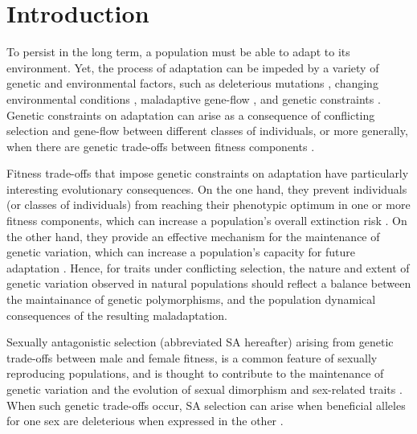 \documentclass[11pt]{article}
\begin{document}
\newpage{}

\section*{Introduction}


To persist in the long term, a population must be able to adapt to its environment. Yet, the process of adaptation can be impeded by a variety of genetic and environmental factors, such as deleterious mutations \citep{Haldane1937}, changing environmental conditions \citep{Maynard-Smith1976, LandeShannon1996,OrrUnckless2008}, maladaptive gene-flow \citep{KirkpatrickBarton1997, BolnickNosil2007}, and genetic constraints \citep{ConnallonHall2018, MatthewsConnallon2019}. Genetic constraints on adaptation can arise as a consequence of conflicting selection and gene-flow between different classes of individuals, or more generally, when there are genetic trade-offs between fitness components \citep{CharlesworthHughes2000, ConnallonHall2018}. 

Fitness trade-offs that impose genetic constraints on adaptation have particularly interesting evolutionary consequences. On the one hand, they prevent individuals (or classes of individuals) from reaching their phenotypic optimum in one or more fitness components, which can increase a population's overall extinction risk \citep{kokko2003sexy,harts2014demography}. On the other hand, they provide an effective mechanism for the maintenance of genetic variation, which can increase a population's capacity for future adaptation \citep{Fisher1930, CharlesworthHughes2000, ConnallonHall2018, MatthewsConnallon2019}. Hence, for traits under conflicting selection, the nature and extent of genetic variation observed in natural populations should reflect a balance between the maintainance of genetic polymorphisms, and the population dynamical consequences of the resulting maladaptation.

Sexually antagonistic selection (abbreviated SA hereafter) arising from genetic trade-offs between male and female fitness, is a common feature of sexually reproducing populations, and is thought to contribute to the maintenance of genetic variation and the evolution of sexual dimorphism and sex-related traits \citep{Lande1980, Rice1992, Charlesworth1999, RiceChippindale2001, BondurianskyChenoweth2009,Olito2019}. When such genetic trade-offs occur, SA selection can arise when beneficial alleles for one sex are deleterious when expressed in the other \citep{Kidwell1977, Rice1992, ConnallonClark2012}. 
\end{document}
